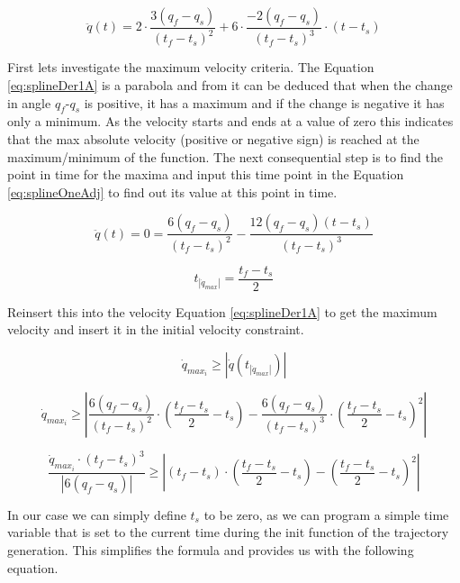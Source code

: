 \begin{equation}
    \ddot{q}(t) = 2\cdot \frac{3(q_{f}-q_{s})}{(t_{f}-t_{s})^2} + 6 \cdot \frac{-2(q_{f}-q_{s})}{(t_{f}-t_{s})^3}\cdot (t-t_{s})
    \label{eq:splineOneDer2A}
\end{equation}

First lets investigate the maximum velocity criteria. The Equation \ref{eq:splineDer1A} is a parabola and from it can be deduced that when the change in angle $q_f$-$q_s$ is positive, it has a maximum and if the change is negative it has only a minimum. As the velocity starts and ends at a value of zero this indicates that the max absolute velocity (positive or negative sign) is reached at the maximum/minimum of the function. 
\newline
The next consequential step is to find the point in time for the maxima and input this time point in the Equation \ref{eq:splineOneAdj} to find out its value at this point in time. 

\begin{equation}
    \ddot{q}(t)= 0=\frac{6(q_{f}-q_{s})}{(t_{f}-t_{s})^2} - \frac{12(q_{f}-q_{s})(t-t_{s})}{(t_{f}-t_{s})^3}
\end{equation}

\begin{equation}
    t_{|\dot{q}_{max}|}=\frac{t_f-t_s}{2}
\end{equation}

Reinsert this into the velocity Equation \ref{eq:splineDer1A} to get the maximum velocity and insert it in the initial velocity constraint.

\begin{equation}
   \dot{q}_{max_i} \geq |\dot{q}(t_{|\dot{q}_{max}|})|
\end{equation}


\begin{equation}
    \dot{q}_{max_i} \geq|\frac{6(q_{f}-q_{s})}{(t_{f}-t_{s})^2} \cdot (\frac{t_f-t_s}{2}-t_{s}) - \frac{6(q_{f}-q_{s})}{(t_{f}-t_{s})^3}\cdot (\frac{t_f-t_s}{2}-t_{s})^2|
    \label{eq:splineDerPutIn}
\end{equation}


\begin{equation}
    \frac{ \dot{q}_{max_i} \cdot (t_{f}-t_{s})^3}{|6(q_{f}-q_{s})|} \geq |    (t_{f}-t_{s}) \cdot (\frac{t_f-t_s}{2}-t_{s}) - (\frac{t_f-t_s}{2}-t_{s})^2|
    \label{eq:splineDePutIn2}
\end{equation}

In our case we can simply define $t_s$ to be zero, as we can program a simple time variable that is set to the current time during the init function of the trajectory generation. This simplifies the formula and provides us with the following equation. 


